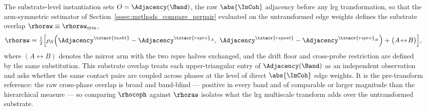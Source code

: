 %
%
The substrate-level instantiation sets \(O = \Adjacency(\Band)\), the raw \(\abs{\ImCoh}\) adjacency before any \gls{lrg} transformation, so that the arm-symmetric estimator of Section~\ref{sssec:methods_compare_perpair} evaluated on the untransformed edge weights defines the substrate overlap \(\rhoraw \equiv \rhoraw_{\mathrm{sym}}\),
\begin{equation}
    \rhoraw = \tfrac{1}{2}\Big[\rho_{S}\!\left(\Adjacency^{\txtacr{taskt}} - \Adjacency^{\txtacr{rspre}_{A}},\; \Adjacency^{\txtacr{rspost}} - \Adjacency^{\txtacr{rspre}_{B}}\right) + \big(A\!\leftrightarrow\!B\big)\Big],
    \label{eq:methods_rho_raw}
\end{equation}
where \((A\!\leftrightarrow\!B)\) denotes the mirror arm with the two \acrshort{rspre} halves exchanged, and the drift floor and cross-probe restriction are defined by the same substitution. This substrate overlap treats each upper-triangular entry of \(\Adjacency(\Band)\) as an independent observation and asks whether the same contact pairs are coupled across phases at the level of direct \(\abs{\ImCoh}\) edge weights. It is the pre-transform reference: the raw cross-phase overlap is broad and band-blind --- positive in every band and of comparable or larger magnitude than the hierarchical measure --- so comparing \(\rhocoph\) against \(\rhoraw\) isolates what the \gls{lrg} multiscale transform adds over the untransformed substrate.



